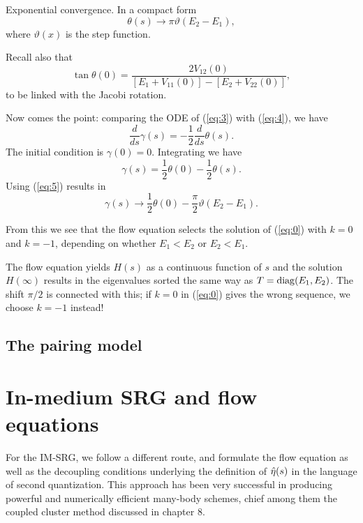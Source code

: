 Exponential convergence. In a compact form
\begin{equation} \theta(s) \rightarrow \pi \vartheta(E_2 - E_1),
  \label{eq:5} \end{equation}
where $\vartheta(x)$ is the  step function.

Recall also that 
\[ \tan \theta(0) = \frac{2 V_{12}(0) }{[E_1 + V_{11}(0)]- [E_2 +
  V_{22}(0)]},
\]
to be linked with the Jacobi  rotation.

Now comes the point: comparing the  ODE of (\ref{eq:3}) with 
(\ref{eq:4}), we have
\[ \frac{d}{ds} \gamma(s) = -\frac{1}{2} \frac{d}{ds} \theta(s). \]
The initial condition is 
$\gamma(0) = 0$. Integrating we have
\[ \gamma(s) = \frac{1}{2}\theta(0) - \frac{1}{2}\theta(s). \]
Using (\ref{eq:5}) results in 
\[ \gamma(s) \rightarrow \frac{1}{2}\theta(0) -
\frac{\pi}{2}\vartheta(E_2-E_1). \]

From this we see that the flow equation selects the solution of (\ref{eq:0}) with
$k=0$ and $k=-1$, depending on whether  $E_1<E_2$ or
$E_2<E_1$.

The flow equation yields $H(s)$ as a continuous function of $s$ and the solution
$H(\infty)$ results in the eigenvalues sorted the same way as
$T = \operatorname{diag}(E_1,E_2)$. The shift $\pi/2$ is connected with this; if $k=0$ in 
(\ref{eq:0}) gives the wrong sequence, we choose $k=-1$ instead!

\subsection{The pairing model}

\section{In-medium SRG and flow equations}

For the IM-SRG, we follow a different route, and formulate the flow equation as well as the decoupling conditions underlying the definition of $\hat{\eta}(s)$ in the language of second quantization. This approach has been very successful in producing powerful and numerically efficient many-body schemes, chief among them the coupled cluster method discussed in chapter 8.

